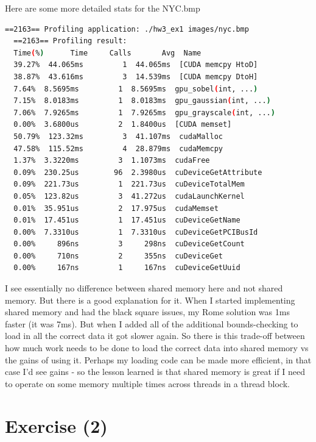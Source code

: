 \documentclass{article}
\begin{document}
Here are some more detailed stats for the NYC.bmp

\begin{mdframed}[backgroundcolor=codeColor,leftmargin=0.0cm,hidealllines=true,%
  innerleftmargin=0.1cm,innerrightmargin=0.1cm,innertopmargin=0.5cm,innerbottommargin=0.10cm,
  roundcorner=15pt]
  \begin{lstlisting}[language=bash]
  ==2163== Profiling application: ./hw3_ex1 images/nyc.bmp
  ==2163== Profiling result:
  Time(%)      Time     Calls       Avg  Name
  39.27%  44.065ms         1  44.065ms  [CUDA memcpy HtoD]
  38.87%  43.616ms         3  14.539ms  [CUDA memcpy DtoH]
  7.64%  8.5695ms         1  8.5695ms  gpu_sobel(int, ...)
  7.15%  8.0183ms         1  8.0183ms  gpu_gaussian(int, ...)
  7.06%  7.9265ms         1  7.9265ms  gpu_grayscale(int, ...)
  0.00%  3.6800us         2  1.8400us  [CUDA memset]
  50.79%  123.32ms         3  41.107ms  cudaMalloc
  47.58%  115.52ms         4  28.879ms  cudaMemcpy
  1.37%  3.3220ms         3  1.1073ms  cudaFree
  0.09%  230.25us        96  2.3980us  cuDeviceGetAttribute
  0.09%  221.73us         1  221.73us  cuDeviceTotalMem
  0.05%  123.82us         3  41.272us  cudaLaunchKernel
  0.01%  35.951us         2  17.975us  cudaMemset
  0.01%  17.451us         1  17.451us  cuDeviceGetName
  0.00%  7.3310us         1  7.3310us  cuDeviceGetPCIBusId
  0.00%     896ns         3     298ns  cuDeviceGetCount
  0.00%     710ns         2     355ns  cuDeviceGet
  0.00%     167ns         1     167ns  cuDeviceGetUuid
  \end{lstlisting}
\end{mdframed}


I see essentially no difference between shared memory here and not shared memory. But there is a good explanation for it. When I started implementing shared memory and had the black square issues, my Rome solution was 1ms
faster (it was 7ms). But when I added all of the additional bounds-checking to load in all the correct data it got slower again. So there is this trade-off between how much work needs to be done to load the correct data into
shared memory vs the gains of using it. Perhaps my loading code can be made more efficient, in that case I'd see gains - so the lesson learned is that shared memory is great if I need to operate on some memory multiple times
across threads in a thread block.

\section{Exercise (2)}%
\label{sec:exercise_2_}
\end{document}
